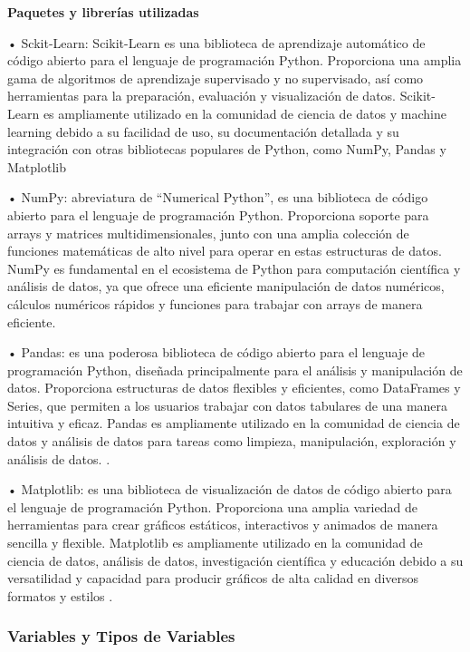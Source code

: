 \documentclass[
  11pt,
  bookmarksnumbered]{article}
\begin{document}
\textbf{Paquetes y librerías utilizadas}

• Sckit-Learn: Scikit-Learn es una biblioteca de aprendizaje automático de código abierto para el lenguaje de programación Python.
Proporciona una amplia gama de algoritmos de aprendizaje supervisado y no supervisado, así como herramientas para la preparación, evaluación y visualización de datos.
Scikit-Learn es ampliamente utilizado en la comunidad de ciencia de datos y machine learning debido a su facilidad de uso, su documentación detallada y su integración con otras bibliotecas populares de Python, como NumPy, Pandas y Matplotlib

• NumPy: abreviatura de ``Numerical Python'', es una biblioteca de código abierto para el lenguaje de programación Python.
Proporciona soporte para arrays y matrices multidimensionales, junto con una amplia colección de funciones matemáticas de alto nivel para operar en estas estructuras de datos.
NumPy es fundamental en el ecosistema de Python para computación científica y análisis de datos, ya que ofrece una eficiente manipulación de datos numéricos, cálculos numéricos rápidos y funciones para trabajar con arrays de manera eficiente.

• Pandas: es una poderosa biblioteca de código abierto para el lenguaje de programación Python, diseñada principalmente para el análisis y manipulación de datos.
Proporciona estructuras de datos flexibles y eficientes, como DataFrames y Series, que permiten a los usuarios trabajar con datos tabulares de una manera intuitiva y eficaz.
Pandas es ampliamente utilizado en la comunidad de ciencia de datos y análisis de datos para tareas como limpieza, manipulación, exploración y análisis de datos.
\textcite{McKinney2010}.

• Matplotlib: es una biblioteca de visualización de datos de código abierto para el lenguaje de programación Python.
Proporciona una amplia variedad de herramientas para crear gráficos estáticos, interactivos y animados de manera sencilla y flexible.
Matplotlib es ampliamente utilizado en la comunidad de ciencia de datos, análisis de datos, investigación científica y educación debido a su versatilidad y capacidad para producir gráficos de alta calidad en diversos formatos y estilos \textcite{Hunter2007}.

\hypertarget{variables-y-tipos-de-variables}{%
\subsubsection{Variables y Tipos de Variables}\label{variables-y-tipos-de-variables}}
\end{document}
